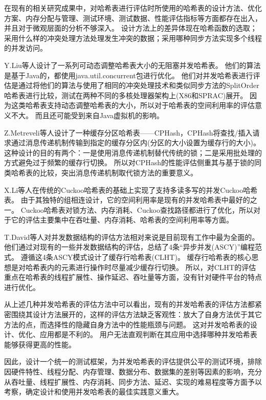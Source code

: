 在现有的相关研究成果中\cite{clht,cuckoo,hopscotch,metreveli2012cphash,nonblocking}，对哈希表进行评估时所使用的哈希表的设计方法、优化方案、内存分配与管理、测试环境、测试数据、性能评估指标等方面都存在出入，并且对于微观层面的分析不够深入。
设计方法上的差异体现在哈希函数的选取；采用什么样的冲突处理方法处理发生冲突的数据；采用哪种同步方法实现多个线程的并发访问。

Y.Liu等人设计了一系列可动态调整哈希表大小的无阻塞并发哈希表\cite{nonblocking}。
他们的算法是基于Java的，都使用java.util.concurrent包进行优化。
他们对并发哈希表进行评估是通过将他们的算法与使用了相同的冲突处理技术和类似同步方法的SplitOrder哈希表\cite{shalev2006split}进行比较，测试在两种不同的多核处理器架构上(X86和SPRAC)展开。
因为这类哈希表支持动态调整哈希表的大小，所以对于哈希表的空间利用率的评估意义不大。
而且还可能受到来自Java虚拟机的影响。

Z.Metreveli等人设计了一种缓存分区哈希表——CPHash\cite{metreveli2012cphash}，CPHash将查找/插入请求通过消息传递机制传输到指定的缓存分区内(分区的大小设置为缓存行的大小)。这种设计的目的有两个：一是使用消息传递机制替代传统的锁；二是采用批处理的方式避免过于频繁的缓存行切换。
所以对CPHash的性能评估侧重其与基于锁的同类哈希表的比较，突出消息传递机制取代锁方法的重要意义。

X.Li等人在传统的Cuckoo哈希表的基础上实现了支持多读多写的并发Cuckoo哈希表\cite{cuckoo}。
由于其独特的组相连设计，它的空间利用率是现有的并发哈希表中最好的之一。
Cuckoo哈希表对锁方法、内存消耗、Cuckoo查找路径都进行了优化，所以对于它的评估主要集中在吞吐量、内存消耗、哈希表的空间利用率等方面。

T.David等人对并发数据结构的评估方法相对来说是目前现有工作中最为全面的\cite{clht}。
他们通过对现有的一些并发数据结构的评估，总结了4条“异步并发(ASCY)”编程范式。
遵循这4条ASCY模式设计了缓存行哈希表(CLHT)。
缓存行哈希表的核心思想是对哈希表内的元素进行操作时尽量减少缓存行切换。
所以，对CLHT的评估重点在哈希表的线程扩展性、操作延迟、吞吐量等方面，没有针对硬件平台的特点进行优化。

从上述几种并发哈希表的评估方法中可以看出，现有的并发哈希表的评估方法都紧密围绕其设计方法展开的，这样的评估方法缺乏客观性：放大了自身方法优于其它方法的点，而选择性的隐藏自身方法中的性能瓶颈与问题。
这对并发哈希表的设计、优化、应用都是不利的。
用户无法直观判断在其应用中选择哪种并发哈希表能够获得更高的性能。

因此，设计一个统一的测试框架，为并发哈希表的评估提供公平的测试环境，排除因硬件特性、线程分配、内存管理、数据分布、数据集的差别等因素的影响，充分从吞吐量、线程扩展性、内存消耗、同步方法、延迟、实现的难易程度等方面予以考察，确定设计和使用并发哈希表的最佳实践意义重大。

